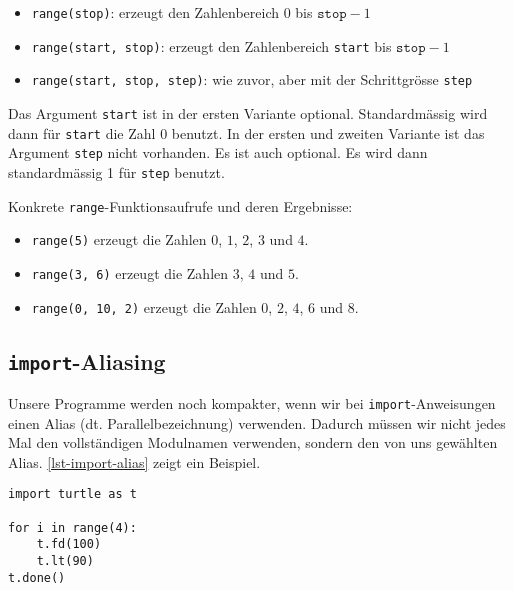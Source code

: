 \begin{itemize}
	\item \lstinline{range(stop)}: erzeugt den Zahlenbereich $0$ bis $\texttt{stop}-1$
	\item \lstinline{range(start, stop)}: erzeugt den Zahlenbereich \lstinline{start} bis $\texttt{stop}-1$
	\item \lstinline{range(start, stop, step)}: wie zuvor, aber mit der Schrittgrösse \lstinline{step}
\end{itemize}

\vspace{-0.25cm}

\begin{important}
Das Argument \lstinline{start} ist in der ersten Variante optional. Standardmässig wird dann für \lstinline{start} die Zahl \num{0} benutzt. In der ersten und zweiten Variante ist das Argument \lstinline{step} nicht vorhanden. Es ist auch optional. Es wird dann standardmässig \num{1} für \lstinline{step} benutzt.
\end{important}

\begin{example}
Konkrete \texttt{range}-Funktionsaufrufe und deren Ergebnisse:
\begin{itemize}
\item \lstinline{range(5)} erzeugt die Zahlen $0$, $1$, $2$, $3$ und $4$.
\item \lstinline{range(3, 6)} erzeugt die Zahlen $3$, $4$ und $5$.
\item \lstinline{range(0, 10, 2)} erzeugt die Zahlen $0$, $2$, $4$, $6$ und $8$.
\end{itemize}

\end{example}

\vspace{-0.25cm}

\subsection{\lstinline{import}-Aliasing}

Unsere Programme werden noch kompakter, wenn wir bei \lstinline{import}-Anweisungen einen Alias (dt. Parallelbezeichnung) verwenden. Dadurch müssen wir nicht jedes Mal den vollständigen Modulnamen verwenden, sondern den von uns gewählten Alias. \autoref{lst-import-alias} zeigt ein Beispiel.

\begin{lstlisting}[caption={Das Turtle-Modul erhält in Zeile $1$ die Bezeichnung \lstinline{t}. Danach können wir die Befehle aus diesem Modul nur noch mit dieser Bezeichnung verwenden.}, label={lst-import-alias}]
import turtle as t

for i in range(4):
    t.fd(100)
    t.lt(90)
t.done()
\end{lstlisting}

